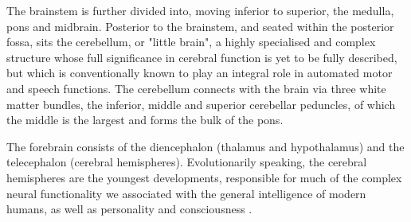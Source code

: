 The brainstem is further divided into, moving inferior to superior, the medulla, pons and midbrain.
Posterior to the brainstem, and seated within the posterior fossa, sits the cerebellum, or "little brain",
a highly specialised and complex structure whose full significance in cerebral function is yet to be fully described, but which is conventionally known to play an integral role in automated motor and speech functions.
The cerebellum connects with the brain via three white matter bundles, the inferior, middle and superior cerebellar peduncles, of which the middle is the largest and forms the bulk of the pons. 

The forebrain consists of the diencephalon (thalamus and hypothalamus) and the telecephalon (cerebral hemispheres).
Evolutionarily speaking, the cerebral hemispheres are the youngest developments, responsible for much of the complex neural functionality we associated with the general intelligence of modern humans, as well as personality and consciousness .

